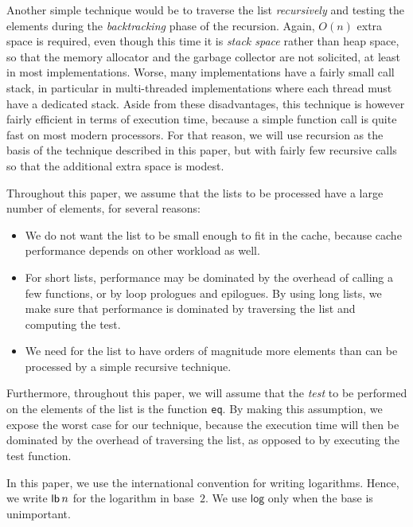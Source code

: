 Another simple technique would be to traverse the list
\emph{recursively} and testing the elements during the
\emph{backtracking} phase of the recursion.  Again, $O(n)$ extra space
is required, even though this time it is \emph{stack space} rather
than heap space, so that the memory allocator and the garbage
collector are not solicited, at least in most implementations.  Worse,
many implementations have a fairly small call stack, in particular in
multi-threaded implementations where each thread must have a dedicated
stack.  Aside from these disadvantages, this technique is however
fairly efficient in terms of execution time, because a simple function
call is quite fast on most modern processors.  For that reason, we
will use recursion as the basis of the technique described in this
paper, but with fairly few recursive calls so that the additional
extra space is modest.

Throughout this paper, we assume that the lists to be processed have a
large number of elements, for several reasons:

\begin{itemize}
\item We do not want the list to be small enough to fit in the cache,
  because cache performance depends on other workload as well.
\item For short lists, performance may be dominated by the overhead of
  calling a few functions, or by loop prologues and epilogues.  By
  using long lists, we make sure that performance is dominated by
  traversing the list and computing the test.
\item We need for the list to have orders of magnitude more elements
  than can be processed by a simple recursive technique.
\end{itemize}

Furthermore, throughout this paper, we will assume that the
\emph{test} to be performed on the elements of the list is the
function \texttt{eq}.  By making this assumption, we expose the worst
case for our technique, because the execution time will then be
dominated by the overhead of traversing the list, as opposed to by
executing the test function.

In this paper, we use the international convention \cite{ISO80000} for
writing logarithms.  Hence, we write $\mathsf{lb}\thinspace n$ for the
logarithm in base~$2$.  We use $\mathsf{log}$ only when the base is
unimportant.

